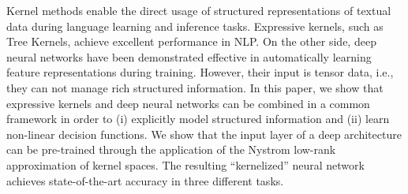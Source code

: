 Kernel methods enable the direct usage of structured representations of textual data during language learning and inference tasks. Expressive kernels, such as Tree Kernels, achieve excellent performance in NLP. On the other side, deep neural networks have been demonstrated effective in automatically learning feature representations during training. However, their input is tensor data, i.e., they can not manage rich structured information. In this paper, we show that expressive kernels and deep neural networks can be combined in a common framework in order to (i) explicitly model structured information and (ii) learn non-linear decision functions. We show that the input layer of a deep architecture can be pre-trained through the application of the Nystrom low-rank approximation of kernel spaces. The resulting ``kernelized'' neural network achieves state-of-the-art accuracy in three different tasks.
